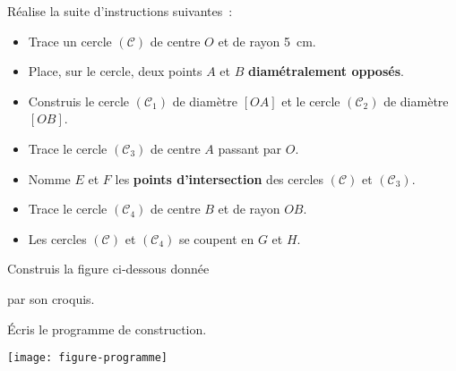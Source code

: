 \begin{activite}

 \begin{partie}
 Réalise la suite d'instructions suivantes :
 \begin{itemize}
  \item Trace un cercle $(\mathcal{C})$ de centre $O$ et de rayon 5 cm.
  \item Place, sur le cercle, deux points $A$ et $B$ \textbf{diamétralement opposés}.
  \item Construis le cercle $(\mathcal{C}_1)$ de diamètre $[OA]$ et le cercle $(\mathcal{C}_2)$ de diamètre $[OB]$.
  \item Trace le cercle $(\mathcal{C}_3)$ de centre $A$ passant par $O$.
  \item Nomme $E$ et $F$ les \textbf{points d'intersection} des cercles $(\mathcal{C})$ et $(\mathcal{C}_3)$.
  \item Trace le cercle $(\mathcal{C}_4)$ de centre $B$ et de rayon $OB$.
  \item Les cercles $(\mathcal{C})$ et $(\mathcal{C}_4)$ se coupent en $G$ et $H$.
  \end{itemize}
  
  \end{partie}
  
 \begin{partie}
 \begin{minipage}[c]{0.48\linewidth} 
Construis la figure ci‑dessous donnée 

par son croquis.

Écris le programme de construction.
 \end{minipage} \hfill %
 \begin{minipage}[c]{0.46\linewidth}
 \texttt{[image: figure-programme]}
  \end{minipage} \\
  
  \end{partie}

\end{activite}

